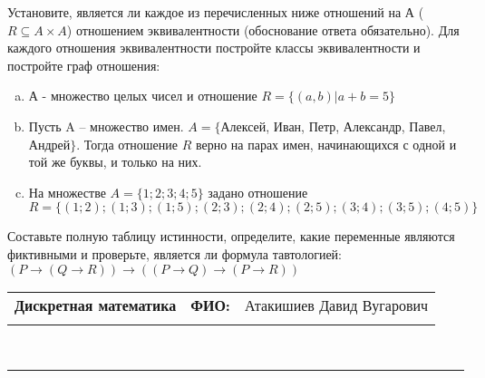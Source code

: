 \documentclass[10pt]{exam}
\newcommand{\class}{Дискретная математика}
\newcommand{\examdate}{}
\begin{document}
\begin{questions}
\question
Установите, является ли каждое из перечисленных ниже отношений на А ($R \subseteq A \times A$) отношением эквивалентности (обоснование ответа обязательно). Для каждого отношения эквивалентности постройте классы 
эквивалентности и постройте граф отношения:
\begin{enumerate} [a)]\setcounter{enumi}{0}
\item А - множество целых чисел и отношение $R = \{(a,b)|a + b = 5\}$
\item Пусть A – множество имен. $A = \{ $Алексей, Иван, Петр, Александр, Павел, Андрей$ \}$. Тогда отношение $R $ верно на парах имен, начинающихся с одной и той же буквы, и только на них.
\item На множестве $A = \{1; 2; 3; 4; 5\}$ задано отношение $R = \{(1; 2); (1; 3); (1; 5); (2; 3); (2; 4); (2; 5); (3; 4); (3; 5); (4; 5)\}$
\end{enumerate}\question Составьте полную таблицу истинности, определите, какие переменные являются фиктивными и проверьте, является ли формула тавтологией:
$(P \rightarrow (Q \rightarrow R)) \rightarrow ((P \rightarrow Q) \rightarrow (P \rightarrow R))$

\end{questions}
\newpage
\begin{flushright}
\begin{tabular}{p{2.8in} r l}
\textbf{\class} & \textbf{ФИО:} &Атакишиев Давид Вугарович
\\

\textbf{\examdate} &&\\
\end{tabular}\\
\end{flushright}
\rule[1ex]{\textwidth}{.1pt}
\end{document}
